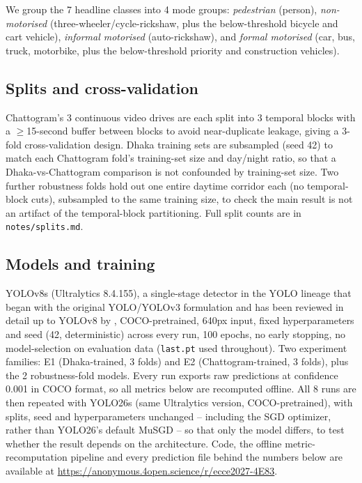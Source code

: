 \documentclass[conference,a4paper]{IEEEtran}
\newcommand{\CodeLink}{\url{https://anonymous.4open.science/r/ecce2027-4E83}}
\begin{document}
We group the 7 headline classes into 4 mode groups: \emph{pedestrian} (person),
\emph{non-motorised} (three-wheeler/cycle-rickshaw, plus the below-threshold bicycle
and cart vehicle), \emph{informal motorised} (auto-rickshaw), and \emph{formal
motorised} (car, bus, truck, motorbike, plus the below-threshold priority and
construction vehicles).

\subsection{Splits and cross-validation}
Chattogram's 3 continuous video drives are each split into 3 temporal blocks with a
$\geq$15-second buffer between blocks to avoid near-duplicate leakage, giving a
3-fold cross-validation design. Dhaka training sets are subsampled (seed 42) to match
each Chattogram fold's training-set size and day/night ratio, so that a
Dhaka-vs-Chattogram comparison is not confounded by training-set size. Two further
robustness folds hold out one entire daytime corridor each (no temporal-block cuts),
subsampled to the same training size, to check the main result is not an artifact of
the temporal-block partitioning. Full split counts are in \texttt{notes/splits.md}.

\subsection{Models and training}
YOLOv8s (Ultralytics 8.4.155), a single-stage detector in the YOLO lineage
that began with the original YOLO/YOLOv3 formulation \cite{redmon2018yolov3} and has
been reviewed in detail up to YOLOv8 by \cite{terven2023yolo}, COCO-pretrained, 640px
input, fixed hyperparameters and seed (42, deterministic) across every run, 100 epochs,
no early stopping, no model-selection on evaluation data (\texttt{last.pt} used
throughout). Two experiment families: E1 (Dhaka-trained, 3 folds) and E2
(Chattogram-trained, 3 folds), plus the 2 robustness-fold models. Every run exports raw
predictions at confidence 0.001 in COCO format, so all metrics below are recomputed
offline. All 8 runs are then repeated with YOLO26s \cite{jocher2026yolo26} (same
Ultralytics version, COCO-pretrained), with splits, seed and hyperparameters unchanged
-- including the SGD optimizer, rather than YOLO26's default MuSGD -- so that only the
model differs, to test whether the result depends on the architecture. Code, the
offline metric-recomputation pipeline and every prediction file behind the numbers
below are available at \CodeLink{}.
\end{document}
